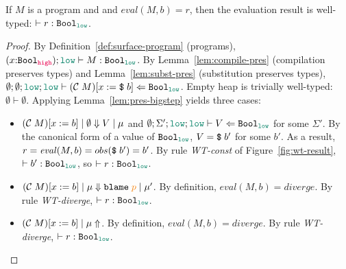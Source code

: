 \begin{theorem}
  \label{thm:type-safety}
  If $M$ is a \Surface program and
  and $\mathit{eval}(M,b)=r$,
  then the evaluation result is well-typed: $\vdash r : \Bool_{\low}$.
\end{theorem}
\begin{proof}
  By Definition~\ref{def:surface-program} (\Surface programs),
  $(x{:}\Bool_{\high});\low \vdash M : \Bool_{\low}$. By
  Lemma~\ref{lem:compile-pres} (compilation preserves types) and
  Lemma~\ref{lem:subst-pres} (substitution preserves types), $\emptyset ;
  \emptyset ; \low ; \low \vdash (\compile{M})[x:=\ccconst{b}] \Leftarrow
  \Bool_{\low}$. Empty heap is trivially well-typed: $\emptyset \vdash
  \emptyset$. Applying Lemma~\ref{lem:pres-bigstep} yields three cases:
  \begin{itemize}
  \item $(\mathcal{C}\;{M})[x:=b] \mid \emptyset \Downarrow V \mid \mu$ and $\emptyset ; \Sigma' ; \low
    ; \low \vdash V \Leftarrow \Bool_{\low}$ for some $\Sigma'$. By the
    canonical form of a value of $\Bool_{\low}$, $V = \text{\texttt{{\$}}}\;{b'}$ for some
    $b'$. As a result, $r=\mathit{eval}(M,b)=obs(\text{\texttt{{\$}}}\;{b'})=b'$. By rule
    \textit{WT-const} of Figure~\ref{fig:wt-result}, $\vdash b' : \Bool_{\low}$,
    so $\vdash r : \Bool_{\low}$.
  \item $(\compile{M})[x:=b] \mid \mu \Downarrow \blame{p} \mid \mu'$. By
    definition, $\mathit{eval}(M,b)=\mathit{diverge}$. By rule
    \textit{WT-diverge}, $\vdash r : \Bool_{\low}$.
  \item $(\mathcal{C}\;{M})[x:=b] \mid \mu \Uparrow$. By
    definition, $\mathit{eval}(M,b)=\mathit{diverge}$. By rule
    \textit{WT-diverge}, $\vdash r : \Bool_{\low}$.
  \end{itemize}
\end{proof}

